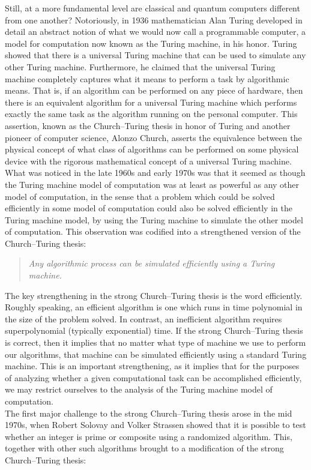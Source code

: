 Still, at a more fundamental level are classical and quantum computers different from one another? Notoriously, in 1936 mathematician Alan Turing developed in detail an abstract notion of what we would now call a programmable computer, a model for computation now known as the Turing machine, in his honor. Turing showed that there is a universal Turing machine that can be used to simulate any other Turing machine. Furthermore, he claimed that the universal Turing machine completely captures what it means to perform a task by algorithmic means. That is, if an algorithm can be performed on any piece of hardware, then there is an equivalent algorithm for a universal Turing machine which performs exactly the same task as the algorithm running on the personal computer. This assertion, known as the Church–Turing thesis in honor of Turing and another pioneer of computer science, Alonzo Church, asserts the equivalence between the physical concept of what class of algorithms can be performed on some physical device with the rigorous mathematical concept of a universal Turing machine. What was noticed in the late 1960s and early 1970s was that it seemed as though the Turing machine model of computation was at least as powerful as any other model of computation, in the sense that a problem which could be solved efficiently in some model of computation could also be solved efficiently in the Turing machine model, by using the Turing machine to simulate the other model of computation. This observation was codified into a strengthened version of the Church–Turing thesis:
\begin{quote}
    \textit{Any algorithmic process can be simulated efficiently using a Turing machine.}
\end{quote}
The key strengthening in the strong Church–Turing thesis is the word efficiently. Roughly speaking, an efficient algorithm is one which runs in time polynomial in the size of the problem solved. In contrast, an inefficient algorithm requires superpolynomial (typically exponential) time. If the strong Church–Turing thesis is correct, then it implies that no matter what type of machine we use to perform our algorithms, that machine can be simulated efficiently using a standard Turing machine. This is an important strengthening, as it implies that for the purposes of analyzing whether a given computational task can be accomplished efficiently, we may restrict ourselves to the analysis of the Turing machine model of computation. \\
The first major challenge to the strong Church–Turing thesis arose in the mid 1970s, when Robert Solovay and Volker Strassen showed that it is possible to test whether an integer is prime or composite using a randomized algorithm. This, together with other such algorithms brought to a modification of the strong Church–Turing thesis:
